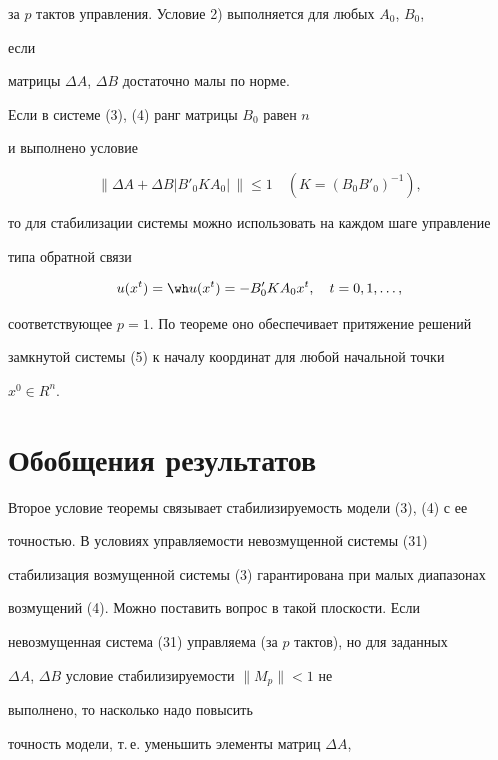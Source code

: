 за $p$ тактов управления. Условие 2) выполняется для любых $A_0$, $B_0$, 


если 


матрицы $\Delta A$, $\Delta B$ достаточно малы по норме. 


 


Если в системе (3), (4) ранг матрицы $B_0$ равен $n$ 


и выполнено условие 


$$ 


\|\Delta A+\Delta B|B'_0 K A_0|\,\|\le 1\quad 


(K=(B_0B'_0)^{-1}), 


$$ 


то для стабилизации системы можно использовать на каждом шаге управление 


типа обратной связи 


$$ 


u(x^t)=\wh u(x^t)=-B'_0 K A_0x^t,\quad t=0,1,\dotsc, 


$$ 


соответствующее $p=1$. По теореме оно обеспечивает притяжение решений 


замкнутой системы (5) к началу координат для любой начальной точки 


$x^0\in R^n$. 


 


\section{Обобщения результатов} 


 


Второе условие теоремы связывает стабилизируемость модели (3), (4) с ее 


точностью. В условиях управляемости невозмущенной системы (31) 


стабилизация возмущенной системы (3) гарантирована при малых диапазонах 


возмущений (4). Можно поставить вопрос в такой плоскости. Если 


невозмущенная система (31) управляема (за $p$ тактов), но для заданных 


$\Delta A$, $\Delta B$ условие стабилизируемости $\|M_p\|<1$ не 


выполнено, то насколько надо повысить 


точность модели, т.\,е. уменьшить элементы матриц $\Delta A$, 


